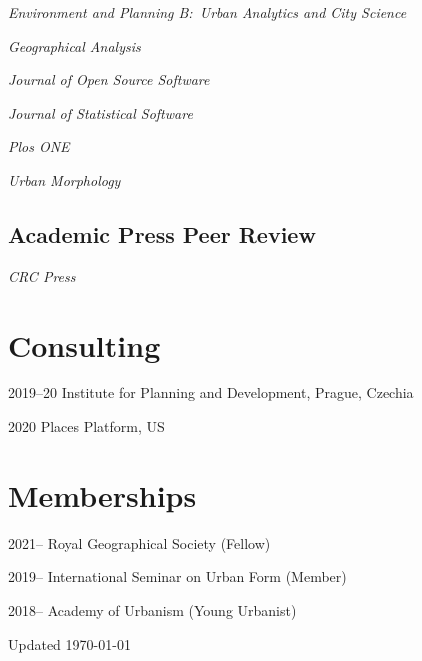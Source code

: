\documentclass[12pt,a4paper]{report}
\newcommand{\listitemspace}{0.25em}
\renewenvironment{itemize}
{\begin{list}{}{\setlength{\leftmargin}{0em}
                \setlength{\parskip}{0em}
                \setlength{\itemsep}{\listitemspace}
                \setlength{\parsep}{\listitemspace}}}
{\end{list}}
\begin{document}
    \begin{itemize}

        \item \textit{Environment and Planning B:\ Urban Analytics and City Science}
        \item \textit{Geographical Analysis}
        \item \textit{Journal of Open Source Software}
        \item \textit{Journal of Statistical Software}
        \item \textit{Plos ONE}
        \item \textit{Urban Morphology}

    \end{itemize}

    \subsection*{Academic Press Peer Review}

    \begin{itemize}

        \item \textit{CRC Press}

    \end{itemize}

    \section*{Consulting}

    \begin{tablist}

        \item[2019--20] \tab{}Institute for Planning and Development, Prague, Czechia
        \item[2020] \tab{}Places Platform, US

    \end{tablist}

    \section*{Memberships}

    \begin{tablist}

        \item[2021--] \tab{}Royal Geographical Society (Fellow)
        \item[2019--] \tab{}International Seminar on Urban Form (Member)
        \item[2018--] \tab{}Academy of Urbanism (Young Urbanist)

    \end{tablist}

    \begin{center}
        \vfill
        Updated \monthyeardate\today
    \end{center}
\end{document}
